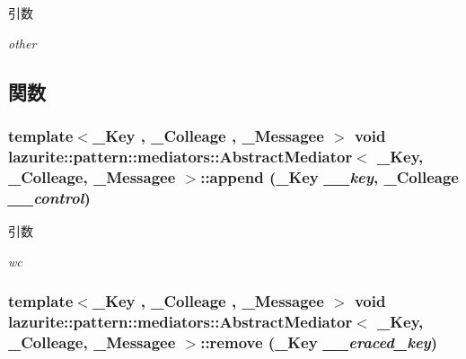 \begin{DoxyParams}{引数}
\item[{\em other}]\end{DoxyParams}


\subsection{関数}
\hypertarget{classlazurite_1_1pattern_1_1mediators_1_1_abstract_mediator_3_01___key_00_01___colleage_00_01___messagee_01_4_a3afba7c48f75db3155a7f951a2028692}{
\subsubsection[{append}]{\setlength{\rightskip}{0pt plus 5cm}template$<$\_\-Key , \_\-Colleage , \_\-Messagee $>$ void lazurite::pattern::mediators::AbstractMediator$<$ \_\-Key, \_\-Colleage, \_\-Messagee $>$::append (\_\-Key {\em \_\-\_\-key}, \/  \_\-Colleage {\em \_\-\_\-control})}}
\label{classlazurite_1_1pattern_1_1mediators_1_1_abstract_mediator_3_01___key_00_01___colleage_00_01___messagee_01_4_a3afba7c48f75db3155a7f951a2028692}

\begin{DoxyParams}{引数}
\item[{\em wc}]\end{DoxyParams}
\hypertarget{classlazurite_1_1pattern_1_1mediators_1_1_abstract_mediator_3_01___key_00_01___colleage_00_01___messagee_01_4_a7cd38d94a7ed5d3d5584dff30e482811}{
\subsubsection[{remove}]{\setlength{\rightskip}{0pt plus 5cm}template$<$\_\-Key , \_\-Colleage , \_\-Messagee $>$ void lazurite::pattern::mediators::AbstractMediator$<$ \_\-Key, \_\-Colleage, \_\-Messagee $>$::remove (\_\-Key {\em \_\-\_\-eraced\_\-key})}}
\label{classlazurite_1_1pattern_1_1mediators_1_1_abstract_mediator_3_01___key_00_01___colleage_00_01___messagee_01_4_a7cd38d94a7ed5d3d5584dff30e482811}

